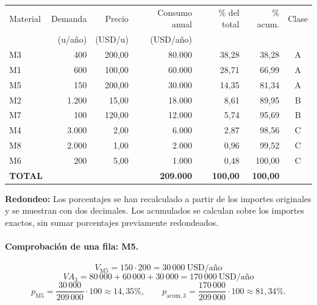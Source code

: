 \documentclass[11pt,a4paper]{article}
\begin{document}
\begin{center}
    \small
    \setlength{\tabcolsep}{4pt}
    \renewcommand{\arraystretch}{1.2}
    \begin{tabular}{@{}lrrrrrc@{}}
        \toprule
        Material       & Demanda & Precio  & Consumo anual    & \% del total    & \% acum.        & Clase \\
                       & (u/año) & (USD/u) & (USD/año)        &                 &                 &       \\
        \midrule
        M3             & 400     & 200,00  & 80.000           & 38,28           & 38,28           & A     \\
        M1             & 600     & 100,00  & 60.000           & 28,71           & 66,99           & A     \\
        M5             & 150     & 200,00  & 30.000           & 14,35           & 81,34           & A     \\
        M2             & 1.200   & 15,00   & 18.000           & 8,61            & 89,95           & B     \\
        M7             & 100     & 120,00  & 12.000           & 5,74            & 95,69           & B     \\
        M4             & 3.000   & 2,00    & 6.000            & 2,87            & 98,56           & C     \\
        M8             & 2.000   & 1,00    & 2.000            & 0,96            & 99,52           & C     \\
        M6             & 200     & 5,00    & 1.000            & 0,48            & 100,00          & C     \\
        \midrule
        \textbf{TOTAL} &         &         & \textbf{209.000} & \textbf{100,00} & \textbf{100,00} &       \\
        \bottomrule
    \end{tabular}
\end{center}

\textbf{Redondeo:} Los porcentajes se han recalculado a partir de los importes originales y se muestran con dos decimales. Los acumulados se calculan sobre los importes exactos, sin sumar porcentajes previamente redondeados.

\paragraph{Comprobación de una fila: M5.}
\[
    V_{\mathrm{M5}} = 150 \cdot 200 = 30\,000\ \text{USD/año}
\]
\[
    VA_3 = 80\,000 + 60\,000 + 30\,000 = 170\,000\ \text{USD/año}
\]
\[
    p_{\mathrm{M5}} = \frac{30\,000}{209\,000}\cdot100 \approx 14{,}35\%,
    \qquad
    p_{\text{acum},3} = \frac{170\,000}{209\,000}\cdot100 \approx 81{,}34\%.
\]
\end{document}
